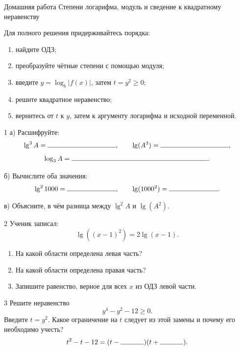 \homeworktitle
  {Домашняя работа}
  {Степени логарифма, модуль и сведение к квадратному неравенству}
\studentline

\begin{routebox}[Маршрут]
  Для полного решения придерживайтесь порядка:
  \begin{enumerate}
    \item найдите ОДЗ;
    \item преобразуйте чётные степени с помощью модуля;
    \item введите \(y=\log_b|f(x)|\), затем \(t=y^2\ge0\);
    \item решите квадратное неравенство;
    \item вернитесь от \(t\) к \(y\), затем к аргументу логарифма и
      исходной переменной.
  \end{enumerate}
\end{routebox}

\begin{homeworktask}{1}
  а) Расшифруйте:
  \[
    \lg^3 A=\answerblank[35mm],
    \qquad
    \lg(A^3)=\answerblank[35mm],
  \]
  \[
    \log_3 A=\answerblank[70mm].
  \]

  б) Вычислите оба значения:
  \[
    \lg^2 1000=\answerblank[25mm],
    \qquad
    \lg(1000^2)=\answerblank[25mm].
  \]

  в) Объясните, в чём разница между \(\lg^2 A\) и \(\lg(A^2)\).
  \answerspace{22mm}
\end{homeworktask}

\newpage
\begin{homeworktask}{2}
  Ученик записал:
  \[
    \lg((x-1)^2)=2\lg(x-1).
  \]
  \begin{enumerate}
    \item На какой области определена левая часть?
    \item На какой области определена правая часть?
    \item Запишите равенство, верное для всех \(x\) из ОДЗ левой части.
  \end{enumerate}
  \answerspace{36mm}
\end{homeworktask}

\begin{homeworktask}{3}
  Решите неравенство
  \[
    y^4-y^2-12\ge0.
  \]
  Введите \(t=y^2\). Какое ограничение на \(t\) следует из этой замены и
  почему его необходимо учесть?
  \[
    t^2-t-12=(t-\answerblank[12mm])(t+\answerblank[12mm]).
  \]
  \answerspace{35mm}
  \shortanswerline
\end{homeworktask}

